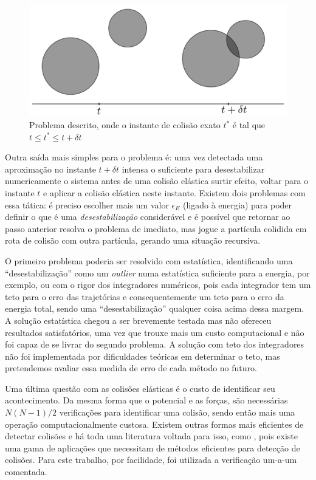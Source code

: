 \begin{figure}
    \centering
    \includegraphics[width=0.7\linewidth]{tcc//img/colisao_intersecao.png}
    \caption{Problema descrito, onde o instante de colisão exato $t^*$ é tal que $t \leq t^* \leq t + \delta t$}
    \label{fig:colisao_intersecao}
\end{figure}

Outra saída mais simples para o problema é: uma vez detectada uma aproximação no instante $t+\delta t$ intensa o suficiente para desestabilizar numericamente o sistema antes de uma colisão elástica surtir efeito, voltar para o instante $t$ e aplicar a colisão elástica neste instante. Existem dois problemas com essa tática: é preciso escolher mais um valor $\epsilon_E$ (ligado à energia) para poder definir o que é uma \textit{desestabilização} considerável e é possível que retornar ao passo anterior resolva o problema de imediato, mas jogue a partícula colidida em rota de colisão com outra partícula, gerando uma situação recursiva.

O primeiro problema poderia ser resolvido com estatística, identificando uma ``desestabilização'' como um \textit{outlier} numa estatística suficiente para a energia, por exemplo, ou com o rigor dos integradores numéricos, pois cada integrador tem um teto para o erro das trajetórias e consequentemente um teto para o erro da energia total, sendo uma ``desestabilização'' qualquer coisa acima dessa margem. A solução estatística chegou a ser brevemente testada mas não ofereceu resultados satisfatórios, uma vez que trouxe mais um custo computacional e não foi capaz de se livrar do segundo problema. A solução com teto dos integradores não foi implementada por dificuldades teóricas em determinar o teto, mas pretendemos avaliar essa medida de erro de cada método no futuro.

Uma última questão com as colisões elásticas é o custo de identificar seu acontecimento. Da mesma forma que o potencial e as forças, são necessárias $N (N-1) / 2$ verificações para identificar uma colisão, sendo então mais uma operação computacionalmente custosa. Existem outras formas mais eficientes de detectar colisões e há toda uma literatura voltada para isso, como \cite{Ericson2005}, pois existe uma gama de aplicações que necessitam de métodos eficientes para detecção de colisões. Para este trabalho, por facilidade, foi utilizada a verificação um-a-um comentada.

